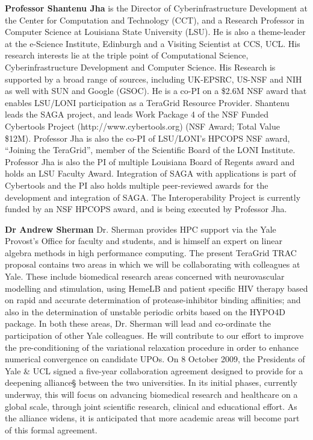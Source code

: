 \textbf{Professor Shantenu Jha} is the Director of Cyberinfrastructure Development at the Center for Computation and Technology (CCT), and a Research Professor in Computer Science at Louisiana State University (LSU). He is also a theme-leader at the e-Science Institute, Edinburgh and a Visiting Scientist at CCS, UCL. His research interests lie at the triple point of Computational Science, Cyberinfrastructure Development and Computer Science.  His Research is supported by a broad range of sources, including UK-EPSRC, US-NSF and NIH as well with SUN and Google (GSOC). He is a co-PI on a \$2.6M NSF award that enables LSU/LONI participation as a TeraGrid Resource Provider. Shantenu leads the SAGA project, and leads Work Package 4 of the NSF Funded Cybertools Project (http://www.cybertools.org) (NSF Award; Total Value \$12M). Professor Jha is also the co-PI of LSU/LONI's HPCOPS NSF award, “Joining the TeraGrid”, member of the Scientific Board of the LONI Institute. 
Professor Jha is also the PI of multiple Louisiana Board of Regents award and holds an LSU  Faculty Award. Integration of SAGA with applications is part of Cybertools and the PI also holds multiple peer-reviewed awards for the development and integration of SAGA. The Interoperability Project is currently funded by an NSF HPCOPS award, and is being executed by Professor Jha.

\textbf{Dr Andrew Sherman}
Dr. Sherman provides HPC support via the Yale Provost's Office for
faculty and students, and is himself an expert on linear algebra
methods in high performance computing. The present TeraGrid TRAC
proposal contains two areas in which we will be collaborating with
colleagues at Yale. These include biomedical research areas concerned
with neurovascular modelling and stimulation, using HemeLB and patient
specific HIV therapy based on rapid and accurate determination of
protease-inhibitor binding affinities; and also in the determination
of unstable periodic orbits based on the HYPO4D package. In both these
areas, Dr. Sherman will lead and co-ordinate the participation of
other Yale colleagues. He will contribute to our effort to improve the
pre-conditioning of the variational relaxation procedure in order to
enhance numerical convergence on candidate UPOs.  On 8 October 2009,
the Presidents of Yale \& UCL signed a five-year collaboration
agreement designed to provide for a deepening alliance§ between the
two universities. In its initial phases, currently underway, this will
focus on advancing biomedical research and healthcare on a global
scale, through joint scientific research, clinical and educational
effort. As the alliance widens, it is anticipated that more academic
areas will become part of this formal agreement.

